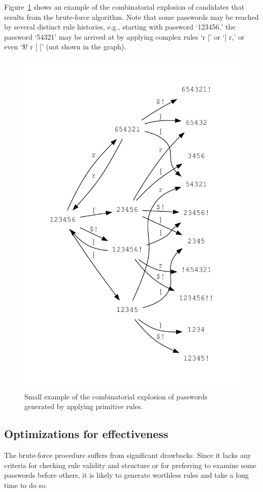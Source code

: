 \documentclass{article}
\begin{document}
Figure~\ref{fig:pwgen} shows an example of the combinatorial explosion of
candidates that results from the brute-force algorithm. Note that some
passwords may be reached by several distinct rule histories, e.g., starting with
password `123456,' the password `54321' may be arrived at by applying complex
rules `r [' or `] r,' or even `\$! r [ [' (not shown in the graph).

\begin{figure}[ht!]
\centering
\includegraphics[width=0.7\linewidth]{figures/example-pw-rules.pdf}
\caption{Small example of the combinatorial explosion of passwords generated by
applying primitive rules.}
\label{fig:pwgen}
\end{figure}

\subsection{Optimizations for effectiveness}

The brute-force procedure suffers from significant drawbacks. Since it lacks
any criteria for checking rule validity and structure or for preferring to
examine some passwords before others, it is likely to generate worthless rules
and take a long time to do so.
\end{document}
